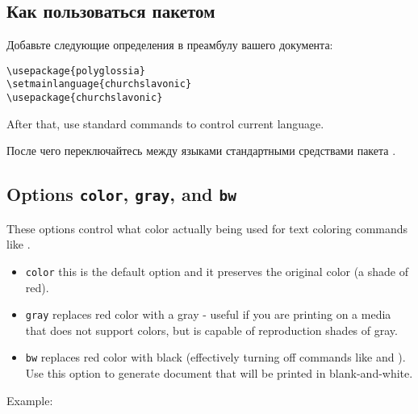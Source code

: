 \begin{RU}
\section{Как пользоваться пакетом}
Добавьте следующие определения в преамбулу вашего документа:
\end{RU}

\begin{verbatim}
\usepackage{polyglossia}
\setmainlanguage{churchslavonic} 
\usepackage{churchslavonic}
\end{verbatim}

\begin{EN}
After that, use standard  commands to control current language.
\end{EN}

\begin{RU}
После чего переключайтесь между языками стандартными средствами пакета .
\end{RU}

\begin{EN}
\subsection{Options \texttt{color}, \texttt{gray}, and \texttt{bw}}
These options control what color actually being used for text coloring commands like .

\begin{itemize}
\item \texttt{color} this is the default option and it preserves the original color (a shade of red).
\item \texttt{gray} replaces red color with a gray - useful if you are printing on a media that
    does not support colors, but is capable of reproduction shades of gray.
\item \texttt{bw} replaces red color with black (effectively turning off commands like  and ). Use
    this option to generate document that will be printed in blank-and-white.
\end{itemize}
Example:
\end{EN}

